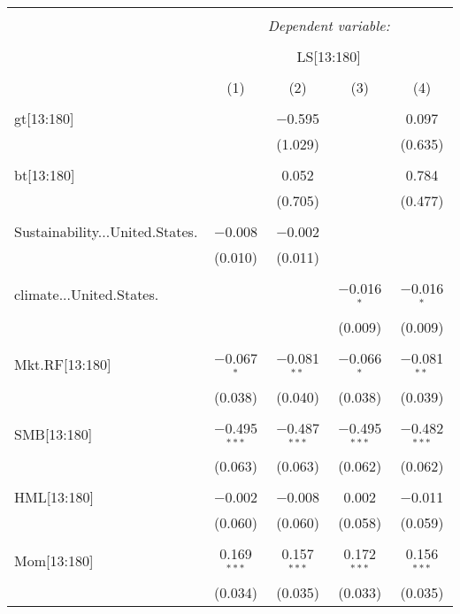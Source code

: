 \documentclass[11pt]{article}
\begin{document}
\begin{table}[!htbp] \centering 
	\caption{} 
	\label{} 
	\begin{tabular}{@{\extracolsep{5pt}}lcccc} 
		\\[-1.8ex]\hline 
		\hline \\[-1.8ex] 
		& \multicolumn{4}{c}{\textit{Dependent variable:}} \\ 
		\cline{2-5} 
		\\[-1.8ex] & \multicolumn{4}{c}{LS[13:180]} \\ 
		\\[-1.8ex] & (1) & (2) & (3) & (4)\\ 
		\hline \\[-1.8ex] 
		gt[13:180] &  & $-$0.595 &  & 0.097 \\ 
		&  & (1.029) &  & (0.635) \\ 
		& & & & \\ 
		bt[13:180] &  & 0.052 &  & 0.784 \\ 
		&  & (0.705) &  & (0.477) \\ 
		& & & & \\ 
		Sustainability...United.States. & $-$0.008 & $-$0.002 &  &  \\ 
		& (0.010) & (0.011) &  &  \\ 
		& & & & \\ 
		climate...United.States. &  &  & $-$0.016$^{*}$ & $-$0.016$^{*}$ \\ 
		&  &  & (0.009) & (0.009) \\ 
		& & & & \\ 
		Mkt.RF[13:180] & $-$0.067$^{*}$ & $-$0.081$^{**}$ & $-$0.066$^{*}$ & $-$0.081$^{**}$ \\ 
		& (0.038) & (0.040) & (0.038) & (0.039) \\ 
		& & & & \\ 
		SMB[13:180] & $-$0.495$^{***}$ & $-$0.487$^{***}$ & $-$0.495$^{***}$ & $-$0.482$^{***}$ \\ 
		& (0.063) & (0.063) & (0.062) & (0.062) \\ 
		& & & & \\ 
		HML[13:180] & $-$0.002 & $-$0.008 & 0.002 & $-$0.011 \\ 
		& (0.060) & (0.060) & (0.058) & (0.059) \\ 
		& & & & \\ 
		Mom[13:180] & 0.169$^{***}$ & 0.157$^{***}$ & 0.172$^{***}$ & 0.156$^{***}$ \\ 
		& (0.034) & (0.035) & (0.033) & (0.035) \\ 

\end{tabular}
\end{table}
\end{document}
